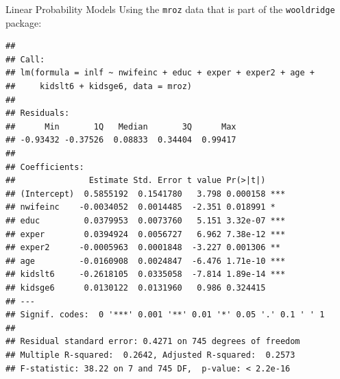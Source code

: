 \documentclass[
  ignorenonframetext,
]{beamer}
\newenvironment{Shaded}{\begin{snugshade}}{\end{snugshade}}
\newcommand{\DecValTok}[1]{\textcolor[rgb]{0.00,0.00,0.81}{#1}}
\newcommand{\FunctionTok}[1]{\textcolor[rgb]{0.00,0.00,0.00}{#1}}
\newcommand{\NormalTok}[1]{#1}
\newcommand{\OtherTok}[1]{\textcolor[rgb]{0.56,0.35,0.01}{#1}}
\newcommand{\SpecialCharTok}[1]{\textcolor[rgb]{0.00,0.00,0.00}{#1}}
\begin{document}
\begin{frame}[fragile]{Linear Probability Models}
\protect\hypertarget{linear-probability-models-2}{}
Using the \texttt{mroz} data that is part of the \texttt{wooldridge}
package:

\tiny

\begin{Shaded}
\end{Shaded}

\begin{verbatim}
## 
## Call:
## lm(formula = inlf ~ nwifeinc + educ + exper + exper2 + age + 
##     kidslt6 + kidsge6, data = mroz)
## 
## Residuals:
##      Min       1Q   Median       3Q      Max 
## -0.93432 -0.37526  0.08833  0.34404  0.99417 
## 
## Coefficients:
##               Estimate Std. Error t value Pr(>|t|)    
## (Intercept)  0.5855192  0.1541780   3.798 0.000158 ***
## nwifeinc    -0.0034052  0.0014485  -2.351 0.018991 *  
## educ         0.0379953  0.0073760   5.151 3.32e-07 ***
## exper        0.0394924  0.0056727   6.962 7.38e-12 ***
## exper2      -0.0005963  0.0001848  -3.227 0.001306 ** 
## age         -0.0160908  0.0024847  -6.476 1.71e-10 ***
## kidslt6     -0.2618105  0.0335058  -7.814 1.89e-14 ***
## kidsge6      0.0130122  0.0131960   0.986 0.324415    
## ---
## Signif. codes:  0 '***' 0.001 '**' 0.01 '*' 0.05 '.' 0.1 ' ' 1
## 
## Residual standard error: 0.4271 on 745 degrees of freedom
## Multiple R-squared:  0.2642, Adjusted R-squared:  0.2573 
## F-statistic: 38.22 on 7 and 745 DF,  p-value: < 2.2e-16
\end{verbatim}
\end{frame}
\end{document}
